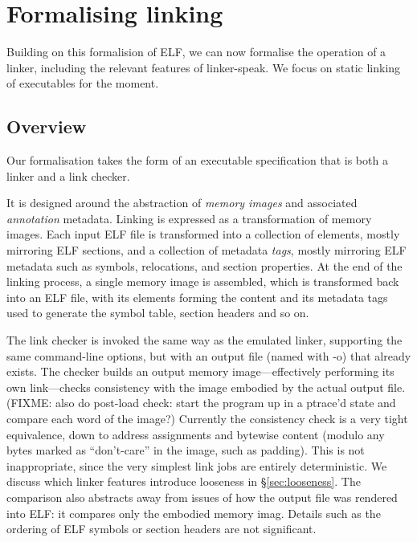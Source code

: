 \section{Formalising linking}

Building on this formalision of ELF, we can now formalise the operation of a linker,
including the relevant features of linker-speak.
We focus on static linking of executables for the moment.

\subsection{Overview}

Our formalisation takes the form of an executable specification that 
is both a linker and a link checker.

It is designed around the abstraction of \emph{memory images} and associated \emph{annotation} metadata.
Linking is expressed as a transformation of memory images.
Each input ELF file is transformed into a collection of elements, mostly mirroring ELF sections,
and a collection of metadata \emph{tags}, mostly mirroring ELF metadata such as 
symbols, relocations, and section properties.
At the end of the linking process, a single memory image is assembled,
which is transformed back into an ELF file, with its elements
forming the content and its metadata tags used to generate the symbol table, section headers
and so on.

The link checker is invoked the same way as the emulated linker, supporting the same command-line options,
but with an output file (named with \textsf{-o}) that already exists.
The checker builds an output memory image---effectively performing its own link---checks consistency with the image
embodied by the actual output file.
(FIXME: also do post-load check: start the program up in a ptrace'd state 
and compare each word of the image?)
Currently the consistency check is a very tight equivalence, down to address assignments and bytewise content
(modulo any bytes marked as ``don't-care'' in the image, such as padding).
This is not inappropriate, since the very simplest link jobs are entirely deterministic.
We discuss which linker features introduce looseness in \S\ref{sec:looseness}.
The comparison also abstracts away from issues of how the output file was rendered into ELF: 
it compares only the embodied memory imag. 
Details such as the ordering of ELF symbols or section headers are not significant.

